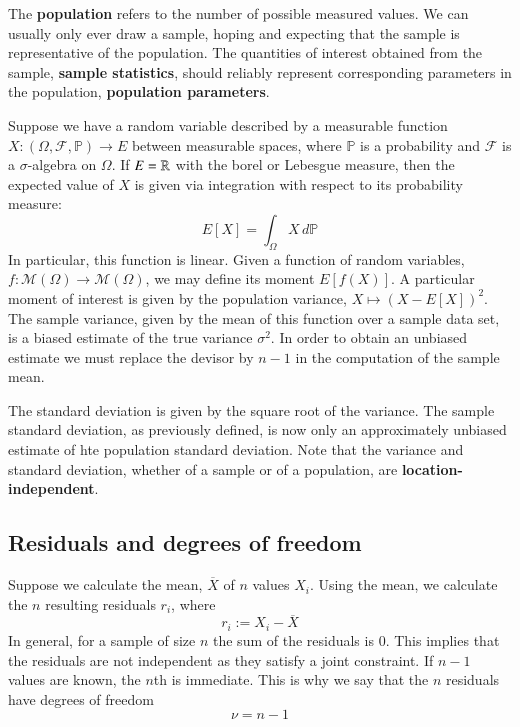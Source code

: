 The \textbf{population} refers to the number of possible measured values. We can usually only ever draw a sample, hoping and expecting that the sample is representative of the population. The quantities of interest obtained from the sample, \textbf{sample statistics}, should reliably represent corresponding parameters in the population, \textbf{population parameters}. 



Suppose we have a random variable described by a measurable function $X:(\Omega,\mathcal{F},\mathbb{P})\rightarrow E$ between measurable spaces, where $\mathbb{P}$ is a probability and $\mathcal{F}$ is a $\sigma$-algebra on $\Omega$. If $E = \mathbb R$ with the borel or Lebesgue measure, then the expected value of $X$ is given via integration with respect to its probability measure:
\begin{equation}
    E[X] = \int_\Omega X\,d\mathbb{P}
\end{equation}
In particular, this function is linear. Given a function of random variables, $f:\mathcal{M}(\Omega)\rightarrow \mathcal{M}(\Omega)$, we may define its moment $E[f(X)]$. A particular moment of interest is given by the population variance, $X\mapsto (X-E[X])^2$. The sample variance, given by the mean of this function over a sample data set, is a biased estimate of the true variance $\sigma^2$. In order to obtain an unbiased estimate we must replace the devisor by $n-1$ in the computation of the sample mean.


The standard deviation is given by the square root of the variance. The sample standard deviation, as previously defined, is now only an approximately unbiased estimate of hte population standard deviation. Note that the variance and standard deviation, whether of a sample or of a population, are \textbf{location-independent}.


\subsection{Residuals and degrees of freedom}

Suppose we calculate the mean, $\overline{X}$ of $n$ values $X_i$. Using the mean, we calculate the $n$ resulting residuals $r_i$, where 
\begin{equation}
    r_i := X_i-\overline{X}
\end{equation}
In general, for a sample of size $n$ the sum of the residuals is $0$. This implies that the residuals are not independent as they satisfy a joint constraint. If $n-1$ values are known, the $n$th is immediate. This is why we say that the $n$ residuals have degrees of freedom 
\begin{equation}
    \nu = n-1
\end{equation}


